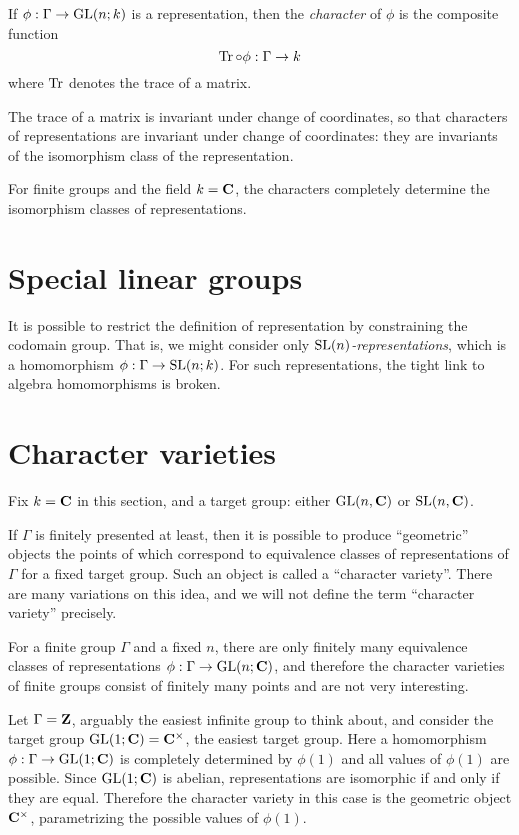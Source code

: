 \documentclass[11pt, oneside, usenames, dvipsnames, svgnames, table, final]{amsart}
\begin{document}
\begin{definition}
  If $\phi : \Gamma \to \operatorname{GL}(n;k)$ is a representation, then the \emph{character} of $\phi$ is the composite function
  \[ \operatorname{Tr} \circ \phi : \Gamma \to k \]
  where $\operatorname{Tr}$ denotes the trace of a matrix.
\end{definition}

The trace of a matrix is invariant under change of coordinates, so that characters of representations are invariant
under change of coordinates: they are invariants of the isomorphism class of the representation.

For finite groups and the field $k=\mathbf{C}$, the characters completely determine the isomorphism classes of representations.

\section{Special linear groups}
\label{sec:spec-line-groups}

It is possible to restrict the definition of representation by constraining the codomain group. That is, we might
consider only \emph{$\operatorname{SL}(n)$-representations}, which is a homomorphism $\phi: \Gamma \to \operatorname{SL}(n; k)$. For such
representations, the tight link to algebra homomorphisms is broken.

\section{Character varieties}
\label{sec:character-varieties}


Fix $k = \mathbf{C}$ in this section, and a target group: either $\operatorname{GL}(n, \mathbf{C})$ or $\operatorname{SL}(n, \mathbf{C})$.

If $\Gamma$ is finitely presented at least, then it is possible to produce ``geometric'' objects the points of which
correspond to equivalence classes of representations of $\Gamma$ for a fixed target group. Such an object is called a
``character variety''. There are many variations on this idea, and we will not define the term ``character variety''
precisely.


\begin{example}
  For a finite group $\Gamma$ and a fixed $n$, there are only finitely many equivalence classes of representations
  $\phi: \Gamma \to \operatorname{GL}(n; \mathbf{C})$, and therefore the character varieties of finite groups consist of finitely many points
  and are not very interesting.
\end{example}

\begin{example}
  Let $\Gamma = \mathbf{Z}$, arguably the easiest infinite group to think about, and consider the target group $\operatorname{GL}(1; \mathbf{C}) =
  \mathbf{C}^\times$, the easiest target group. Here a homomorphism $\phi : \Gamma \to \operatorname{GL}(1; \mathbf{C})$ is completely determined by
  $\phi(1)$ and all values of $\phi(1)$ are possible. Since $\operatorname{GL}(1; \mathbf{C})$ is abelian, representations are isomorphic if
  and only if they are equal. Therefore the character variety in this case is the geometric object $\mathbf{C}^\times$,
  parametrizing the possible values of $\phi(1)$.
\end{example}
\end{document}
